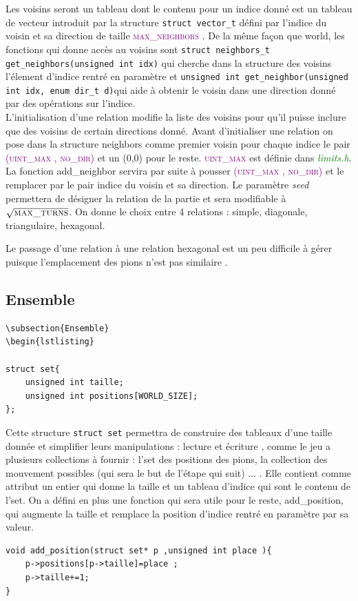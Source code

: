 \documentclass[a4paper]{article}
\begin{document}
Les voisins seront un tableau dont le contenu pour un indice donné est un tableau de vecteur introduit par la structure \lstinline|struct vector_t| défini par l’indice
 du voisin et sa direction de taille \textcolor{purple}{\textsc{max\_neighbors}} . De la même façon que world, les fonctions qui donne 
 accès au voisins sont \lstinline|struct neighbors_t get_neighbors(unsigned int idx)| qui cherche dans la structure des voisins 
 l’élement d’indice rentré en paramètre et \lstinline|unsigned int get_neighbor(unsigned int idx, enum dir_t d)|qui aide à obtenir 
 le voisin dans une direction donné par des opérations sur l’indice.\\ 

L’initialisation d’une relation modifie la liste des voisins pour qu’il puisse inclure que des voisins de certain directions donné. 
Avant d’initialiser une relation on pose dans la structure neighbors comme premier voisin pour chaque indice le pair 
\textcolor{purple}{\textsc{(uint\_max , no\_dir)}} et un (0,0) pour le reste. \textcolor{purple}{\textsc{uint\_max}} est définie 
dans \textcolor{green}{\textit{limits.h}}. La fonction add\_neighbor servira par suite à pousser \textcolor{purple}{\textsc{(uint\_max , no\_dir)}} 
et le remplacer par le pair indice du voisin et sa direction.
Le paramètre \textit{seed} permettera de désigner la relation de la partie et sera modifiable à $\sqrt{\textsc{max\_turns}}$. On donne le choix entre 4 relations : simple, diagonale, triangulaire, hexagonal.

Le passage d'une relation à une relation hexagonal est un peu difficile à gérer puisque l'emplacement des pions n'est pas similaire .  

\subsection{Ensemble}
\begin{lstlisting}
\subsection{Ensemble}
\begin{lstlisting}

struct set{
    unsigned int taille;
    unsigned int positions[WORLD_SIZE];
};
\end{lstlisting}
Cette structure \lstinline|struct set|  permettra de construire des tableaux d’une taille donnée et simplifier leurs 
manipulations : lecture et écriture , comme le jeu a plusieurs collections à fournir : l’set des positions des pions, la 
collection des mouvement possibles (qui sera le but de l’étape qui suit) ... . Elle contient comme attribut un entier qui donne la 
taille et un tableau d'indice qui sont le contenu de l'set.
On a défini en plus une fonction qui sera utile pour le reste, add\_position, qui augmente la taille et remplace la position d’indice 
rentré en paramètre par sa valeur. 
\begin{lstlisting}
void add_position(struct set* p ,unsigned int place ){
    p->positions[p->taille]=place ;
    p->taille+=1;
}
\end{lstlisting}
\end{document}
